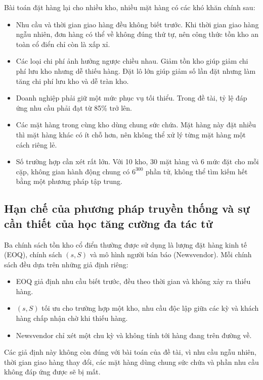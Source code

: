 Bài toán đặt hàng lại cho nhiều kho, nhiều mặt hàng có các khó khăn chính sau:
\begin{itemize}
    \item Nhu cầu và thời gian giao hàng đều không biết trước. Khi thời gian giao hàng ngẫu nhiên, đơn hàng có thể về không đúng thứ tự, nên công thức tồn kho an toàn cổ điển chỉ còn là xấp xỉ.
    \item Các loại chi phí ảnh hưởng ngược chiều nhau. Giảm tồn kho giúp giảm chi phí lưu kho nhưng dễ thiếu hàng. Đặt lô lớn giúp giảm số lần đặt nhưng làm tăng chi phí lưu kho và dễ tràn kho.
    \item Doanh nghiệp phải giữ một mức phục vụ tối thiểu. Trong đề tài, tỷ lệ đáp ứng nhu cầu phải đạt từ 85\% trở lên.
    \item Các mặt hàng trong cùng kho dùng chung sức chứa. Mặt hàng này đặt nhiều thì mặt hàng khác có ít chỗ hơn, nên không thể xử lý từng mặt hàng một cách riêng lẻ.
    \item Số trường hợp cần xét rất lớn. Với 10 kho, 30 mặt hàng và 6 mức đặt cho mỗi cặp, không gian hành động chung có $6^{300}$ phần tử, không thể tìm kiếm hết bằng một phương pháp tập trung.
\end{itemize}

\subsection{Hạn chế của phương pháp truyền thống và sự cần thiết của học tăng cường đa tác tử}
\label{subsec:khoangtrong}

Ba chính sách tồn kho cổ điển thường được sử dụng là lượng đặt hàng kinh tế (EOQ), chính sách $(s, S)$ và mô hình người bán báo (Newsvendor). Mỗi chính sách đều dựa trên những giả định riêng:
\begin{itemize}
    \item EOQ giả định nhu cầu biết trước, đều theo thời gian và không xảy ra thiếu hàng.
    \item $(s, S)$ tối ưu cho trường hợp một kho, nhu cầu độc lập giữa các kỳ và khách hàng chấp nhận chờ khi thiếu hàng.
    \item Newsvendor chỉ xét một chu kỳ và không tính tới hàng đang trên đường về.
\end{itemize}

Các giả định này không còn đúng với bài toán của đề tài, vì nhu cầu ngẫu nhiên, thời gian giao hàng thay đổi, các mặt hàng dùng chung sức chứa và phần nhu cầu không đáp ứng được sẽ bị mất.

